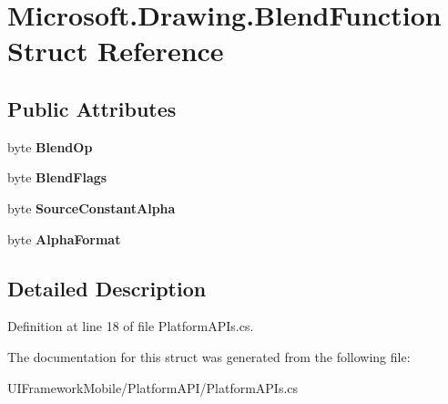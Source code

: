 \hypertarget{struct_microsoft_1_1_drawing_1_1_blend_function}{
\section{Microsoft.Drawing.BlendFunction Struct Reference}
\label{struct_microsoft_1_1_drawing_1_1_blend_function}
}
\subsection*{Public Attributes}
\begin{DoxyCompactItemize}
\item 
\hypertarget{struct_microsoft_1_1_drawing_1_1_blend_function_a4bd4034affae6ca024eb5e94c68c2900}{
byte {\bfseries BlendOp}}
\label{struct_microsoft_1_1_drawing_1_1_blend_function_a4bd4034affae6ca024eb5e94c68c2900}

\item 
\hypertarget{struct_microsoft_1_1_drawing_1_1_blend_function_a77cc940fe977b83250d0591ebcb3bfd6}{
byte {\bfseries BlendFlags}}
\label{struct_microsoft_1_1_drawing_1_1_blend_function_a77cc940fe977b83250d0591ebcb3bfd6}

\item 
\hypertarget{struct_microsoft_1_1_drawing_1_1_blend_function_a3ce13f05f65b2a9d49716552325a3220}{
byte {\bfseries SourceConstantAlpha}}
\label{struct_microsoft_1_1_drawing_1_1_blend_function_a3ce13f05f65b2a9d49716552325a3220}

\item 
\hypertarget{struct_microsoft_1_1_drawing_1_1_blend_function_a0702cd99614f0173e465b31fced6584a}{
byte {\bfseries AlphaFormat}}
\label{struct_microsoft_1_1_drawing_1_1_blend_function_a0702cd99614f0173e465b31fced6584a}

\end{DoxyCompactItemize}


\subsection{Detailed Description}


Definition at line 18 of file PlatformAPIs.cs.

The documentation for this struct was generated from the following file:\begin{DoxyCompactItemize}
\item 
UIFrameworkMobile/PlatformAPI/PlatformAPIs.cs\end{DoxyCompactItemize}
